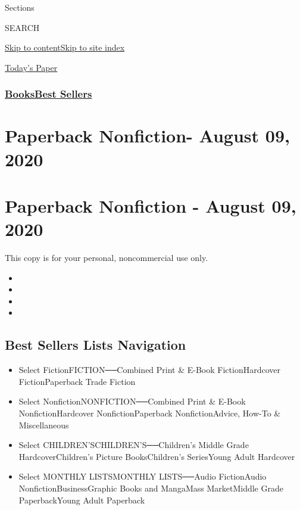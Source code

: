 Sections

SEARCH

\protect\hyperlink{site-content}{Skip to
content}\protect\hyperlink{site-index}{Skip to site index}

\href{https://myaccount.nytimes3xbfgragh.onion/auth/login?response_type=cookie\&client_id=vi}{}

\href{https://www.nytimes3xbfgragh.onion/section/todayspaper}{Today's
Paper}

\hypertarget{booksbest-sellers}{%
\subsubsection{\texorpdfstring{\href{/section/books/}{Books}\textbar{}\href{/books/best-sellers/}{Best
Sellers}}{Books\textbar{}Best Sellers}}\label{booksbest-sellers}}

\hypertarget{paperback-nonfiction--august-09-2020}{%
\section{Paperback Nonfiction- August 09,
2020}\label{paperback-nonfiction--august-09-2020}}

\hypertarget{paperback-nonfiction---august-09-2020}{%
\section{Paperback Nonfiction - August 09,
2020}\label{paperback-nonfiction---august-09-2020}}

This copy is for your personal, noncommercial use only.

\begin{itemize}
\item
\item
\item
\item
\end{itemize}

\hypertarget{best-sellers-lists-navigation}{%
\subsection{Best Sellers Lists
Navigation}\label{best-sellers-lists-navigation}}

\begin{itemize}
\tightlist
\item
  Select FictionFICTION──Combined Print \& E-Book FictionHardcover
  FictionPaperback Trade Fiction
\item
  Select NonfictionNONFICTION──Combined Print \& E-Book
  NonfictionHardcover NonfictionPaperback NonfictionAdvice, How-To \&
  Miscellaneous
\item
  Select CHILDREN'SCHILDREN'S──Children's Middle Grade
  HardcoverChildren's Picture BooksChildren's SeriesYoung Adult
  Hardcover
\item
  Select MONTHLY LISTSMONTHLY LISTS──Audio FictionAudio
  NonfictionBusinessGraphic Books and MangaMass MarketMiddle Grade
  PaperbackYoung Adult Paperback
\end{itemize}

